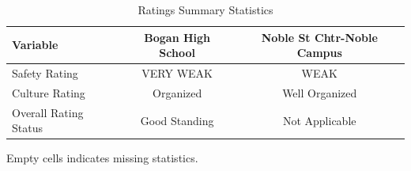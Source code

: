 \begin{table}[H]
\renewcommand{\arraystretch}{1.5}
\caption*{
{\large Ratings Summary Statistics}
} 

\fontsize{10pt}{11pt}\selectfont

\begin{tabular*}{\linewidth}{@{\extracolsep{\fill}}lcc}
\toprule
Variable & Bogan High School & Noble St Chtr-Noble Campus \\ 
\midrule\addlinespace[2.5pt]
Safety Rating & VERY WEAK & WEAK \\
Culture Rating & Organized & Well Organized \\
Overall Rating Status & Good Standing & Not Applicable \\
\bottomrule
\end{tabular*}
\begin{minipage}{\linewidth}
Empty cells indicates missing statistics.\\
\end{minipage}
\end{table}
